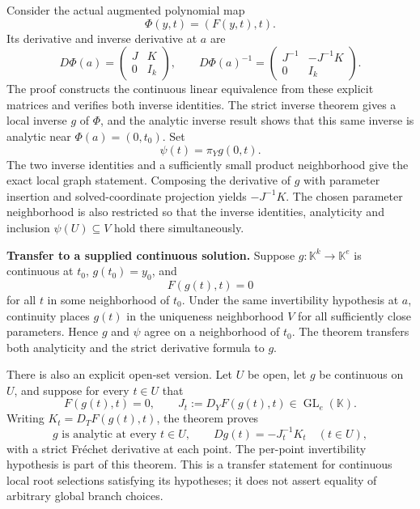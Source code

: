 Consider the actual augmented polynomial map \[
\Phi(y,t)=(F(y,t),t).
\] Its derivative and inverse derivative at \(a\) are \[
D\Phi(a)=
\begin{pmatrix}J&K\\0&I_k\end{pmatrix},
\qquad
D\Phi(a)^{-1}=
\begin{pmatrix}J^{-1}&-J^{-1}K\\0&I_k\end{pmatrix}.
\] The proof constructs the continuous linear equivalence from these
explicit matrices and verifies both inverse identities. The strict
inverse theorem gives a local inverse \(g\) of \(\Phi\), and the
analytic inverse result shows that this same inverse is analytic near
\(\Phi(a)=(0,t_0)\). Set \[
\psi(t)=\pi_Y g(0,t).
\] The two inverse identities and a sufficiently small product
neighborhood give the exact local graph statement. Composing the
derivative of \(g\) with parameter insertion and solved-coordinate
projection yields \(-J^{-1}K\). The chosen parameter neighborhood is
also restricted so that the inverse identities, analyticity and
inclusion \(\psi(U)\subseteq V\) hold there simultaneously.

\textbf{Transfer to a supplied continuous solution.} Suppose
\(g:\mathbb K^k\to\mathbb K^e\) is continuous at \(t_0\),
\(g(t_0)=y_0\), and \[
F(g(t),t)=0
\] for all \(t\) in some neighborhood of \(t_0\). Under the same
invertibility hypothesis at \(a\), continuity places \(g(t)\) in the
uniqueness neighborhood \(V\) for all sufficiently close parameters.
Hence \(g\) and \(\psi\) agree on a neighborhood of \(t_0\). The theorem
 transfers both analyticity
and the strict derivative formula to \(g\).

There is also an explicit open-set version. Let \(U\) be open, let \(g\)
be continuous on \(U\), and suppose for every \(t\in U\) that \[
F(g(t),t)=0,
\qquad
J_t:=D_YF(g(t),t)\in\operatorname{GL}_e(\mathbb K).
\] Writing \(K_t=D_TF(g(t),t)\), the theorem
 proves \[
g\text{ is analytic at every }t\in U,
\qquad Dg(t)=-J_t^{-1}K_t\quad(t\in U),
\] with a strict Fréchet derivative at each point. The per-point
invertibility hypothesis is part of this theorem. This is a transfer
statement for continuous local root selections satisfying its
hypotheses; it does not assert equality of arbitrary global branch
choices.

